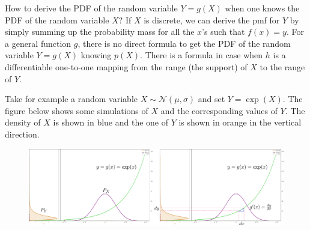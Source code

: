 How to derive the PDF of the random variable $Y=g(X)$ when one knows the PDF of the random variable $X$? If $X$ is discrete, we can derive the pmf for $Y$ by simply summing up the probability mass for all the $x$'s such that $f(x)=y$. For a general function $g$, there is no direct formula to get the PDF of the random variable $Y=g(X)$ knowing $p(X)$. There is a formula in case when $h$ is a differentiable one-to-one mapping from the range (\ie the support) of $X$ to the range of $Y$.

Take for example a random variable $X\sim \mathcal{N}(\mu, \sigma)$ and set $Y=\exp(X)$. The figure below shows some simulations of $X$ and the corresponding values of $Y$. The density of $X$ is shown in blue and the one of $Y$ is shown in orange in the vertical direction.

\begin{figure}[t]
	\centering
	\includegraphics[scale=0.23]{./images/generative/flows/change_of_vars.pdf}
\end{figure}

